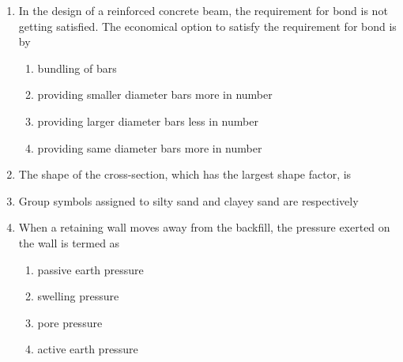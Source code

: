 \documentclass[journal]{IEEEtran}
\begin{document}
\begin{enumerate}
\item In the design of a reinforced concrete beam, the requirement for bond is not getting satisfied. The economical option to satisfy the requirement for bond is by  \hfill {}

\begin{enumerate}
\item bundling of bars 
\item providing smaller diameter bars more in number 
\item  providing larger diameter bars less in number 
\item providing same diameter bars more in number
\end{enumerate}


\item The shape of the cross-section, which has the largest shape factor, is  \hfill {}

\begin{enumerate}
\end{enumerate}




\item  Group symbols assigned to silty sand and clayey sand are respectively  \hfill {}
\begin{enumerate}
\end{enumerate}

\item When a retaining wall moves away from the backfill, the pressure exerted on the wall is termed as \hfill {}


\begin{enumerate}
\item passive earth pressure
\item swelling pressure
\item pore pressure
\item active earth pressure
\end{enumerate}



\end{enumerate}
\end{document}
